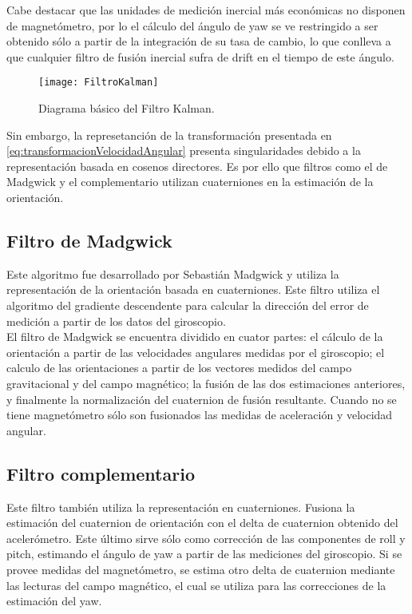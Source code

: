 Cabe destacar que las unidades de medición inercial más económicas no disponen de magnetómetro, por lo el cálculo  del ángulo de yaw se ve restringido a ser obtenido sólo a partir de la integración de su tasa de cambio, lo que conlleva a que cualquier filtro de fusión inercial sufra de drift  en el tiempo de este ángulo.


\begin{figure}[H]
	\centering
	\texttt{[image: FiltroKalman]}
	\caption[Diagrama básico del Filtro Kalman]{Diagrama básico del Filtro Kalman.}
	\label{fig:diagramaFiltroKalman}
\end{figure}



Sin embargo, la represetanción de la transformación presentada en \ref{eq:transformacionVelocidadAngular} presenta singularidades debido a la representación basada en cosenos directores. Es por ello que filtros como el de Madgwick y el complementario utilizan cuaterniones en la estimación de la orientación.

\subsection{ Filtro de Madgwick }

Este algoritmo fue desarrollado por Sebastián Madgwick \cite{Madgwick} y utiliza la representación de la orientación basada en cuaterniones. Este filtro utiliza el algoritmo del gradiente descendente para calcular la dirección del error de medición a partir de los datos del giroscopio.\\

El filtro de Madgwick se encuentra dividido en cuator partes: el cálculo de la orientación a partir de las velocidades angulares medidas por el giroscopio; el calculo de las orientaciones a partir de los vectores medidos del campo gravitacional y del campo magnético; la fusión de las dos estimaciones anteriores, y finalmente la normalización del cuaternion de fusión resultante. Cuando no se tiene magnetómetro sólo son fusionados las medidas de aceleración y velocidad angular.

\subsection{ Filtro complementario }
Este filtro también utiliza la representación en cuaterniones. Fusiona la estimación del cuaternion de orientación con el delta de cuaternion obtenido del acelerómetro. Este último sirve sólo como corrección de las componentes de roll y pitch, estimando el ángulo de yaw a partir de las mediciones del giroscopio. Si se provee medidas del magnetómetro, se estima otro delta de cuaternion mediante las lecturas del campo  magnético, el cual se utiliza para las correcciones de la estimación del yaw.\\

